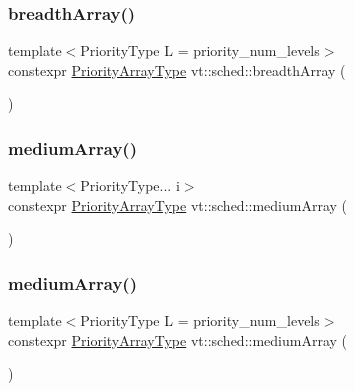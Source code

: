 \subsubsection{\texorpdfstring{breadth\+Array()}{breadthArray()}\hspace{0.1cm}{\footnotesize\ttfamily [2/2]}}
{\footnotesize\ttfamily template$<$Priority\+Type L = priority\+\_\+num\+\_\+levels$>$ \\
constexpr \hyperlink{namespacevt_1_1sched_a2dbd1daff26f79efbff3f418ad9b2a8b}{Priority\+Array\+Type} vt\+::sched\+::breadth\+Array (\begin{DoxyParamCaption}{ }\end{DoxyParamCaption})}

\mbox{\label{namespacevt_1_1sched_a05afd033ab9ecc1f0d1dc37b8b9b7827}} 
\subsubsection{\texorpdfstring{medium\+Array()}{mediumArray()}\hspace{0.1cm}{\footnotesize\ttfamily [1/2]}}
{\footnotesize\ttfamily template$<$Priority\+Type... i$>$ \\
constexpr \hyperlink{namespacevt_1_1sched_a2dbd1daff26f79efbff3f418ad9b2a8b}{Priority\+Array\+Type} vt\+::sched\+::medium\+Array (\begin{DoxyParamCaption}\item[{std\+::integer\+\_\+sequence$<$ \hyperlink{namespacevt_a86bff9f556eb761b27fc8600d006ac04}{Priority\+Type}, i... $>$}]{ }\end{DoxyParamCaption})}

\mbox{\label{namespacevt_1_1sched_a3f4c11ddd24523a16b3f3606a4662014}} 
\subsubsection{\texorpdfstring{medium\+Array()}{mediumArray()}\hspace{0.1cm}{\footnotesize\ttfamily [2/2]}}
{\footnotesize\ttfamily template$<$Priority\+Type L = priority\+\_\+num\+\_\+levels$>$ \\
constexpr \hyperlink{namespacevt_1_1sched_a2dbd1daff26f79efbff3f418ad9b2a8b}{Priority\+Array\+Type} vt\+::sched\+::medium\+Array (\begin{DoxyParamCaption}{ }\end{DoxyParamCaption})}

